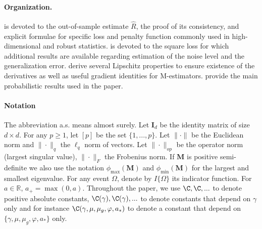 \documentclass[11pt]{amsart}
\numberwithin{equation}{section}
\numberwithin{equation}{section}
\newcommand\onArxivOrInJournal[2]{#2}
\def\constants{\gamma,\mu,\mu_g,\varphi,a_*}
\def\real{{\mathbb{R}}}
\def\R{{\real}}
\def\mathbold{\boldsymbol} %
\def\bI{\mathbold{I}}\def\hbI{{\widehat{\bI}}}\def\tbI{{\widetilde{\bI}}}
\def\bM{\mathbold{M}}\def\hbM{{\widehat{\bM}}}\def\tbM{{\widetilde{\bM}}}
\begin{document}
\paragraph{Organization.}
 is devoted to the out-of-sample estimate $\hat R$,
the proof of its consistency, and
explicit formulae 
for specific loss and penalty function commonly used in high-dimensional and
robust statistics.
 is devoted to the square loss for which
additional results are available regarding estimation of the noise level
and the generalization error.
 derive several Lipschitz properties
to ensure existence of the derivatives as well as useful
gradient identities for M-estimators.
 provide the main
probabilistic results used in the paper.

\paragraph{Notation}

The abbreviation a.s. means almost surely.
Let $\bI_d$ be the identity matrix of size $d\times d$.
For any $p\ge 1$, let $[p]$ be the set $\{1,...,p\}$.
Let $\|\cdot\|$ be the Euclidean norm
and $\|\cdot\|_q$ the $\ell_q$ norm of vectors.
Let $\|\cdot\|_{op}$ be the operator norm (largest singular value),
$\|\cdot\|_F$ the Frobenius norm.
If $\bM$ is positive semi-definite we also use the notation
$\phi_{\max}(\bM)$ and $\phi_{\min}(\bM)$ for the largest and smallest
eigenvalue.
For any event $\Omega$, denote by $I\{\Omega\}$ its indicator function. 
For $a\in\R$, $a_+=\max(0,a)$.
Throughout the paper, we use $\C, \C,...$ to denote positive absolute constants,
$\C(\gamma),\C(\gamma),...$ to denote constants that depend on $\gamma$ only
and for instance $\C(\constants)$ to denote a constant that depend on
$\{\constants\}$ only. 
\end{document}
